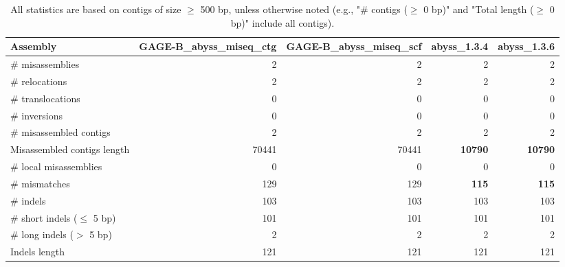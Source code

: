 \documentclass[12pt,a4paper]{article}
\begin{document}
\begin{table}[ht]
\begin{center}
\caption{All statistics are based on contigs of size $\geq$ 500 bp, unless otherwise noted (e.g., "\# contigs ($\geq$ 0 bp)" and "Total length ($\geq$ 0 bp)" include all contigs).}
\begin{tabular}{|l*{4}{|r}|}
\hline
Assembly & GAGE-B\_abyss\_miseq\_ctg & GAGE-B\_abyss\_miseq\_scf & abyss\_1.3.4 & abyss\_1.3.6 \\ \hline
\# misassemblies & 2 & 2 & 2 & 2 \\ \hline
\hspace{5mm}\# relocations & 2 & 2 & 2 & 2 \\ \hline
\hspace{5mm}\# translocations & 0 & 0 & 0 & 0 \\ \hline
\hspace{5mm}\# inversions & 0 & 0 & 0 & 0 \\ \hline
\# misassembled contigs & 2 & 2 & 2 & 2 \\ \hline
Misassembled contigs length & 70441 & 70441 & {\bf 10790} & {\bf 10790} \\ \hline
\# local misassemblies & 0 & 0 & 0 & 0 \\ \hline
\# mismatches & 129 & 129 & {\bf 115} & {\bf 115} \\ \hline
\# indels & 103 & 103 & 103 & 103 \\ \hline
\hspace{5mm}\# short indels ($\leq$ 5 bp) & 101 & 101 & 101 & 101 \\ \hline
\hspace{5mm}\# long indels ($>$ 5 bp) & 2 & 2 & 2 & 2 \\ \hline
Indels length & 121 & 121 & 121 & 121 \\ \hline
\end{tabular}
\end{center}
\end{table}
\end{document}
